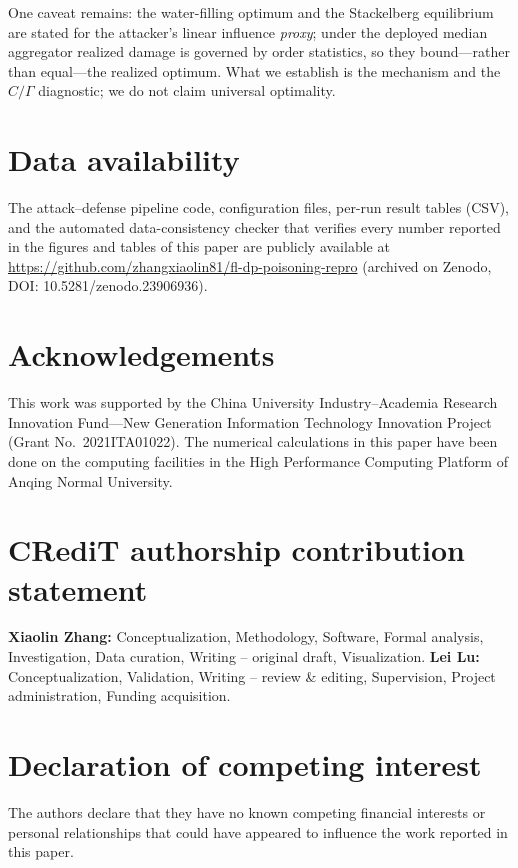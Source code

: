 \documentclass[final,1p,times]{elsarticle}
\begin{document}
One caveat remains: the water-filling optimum and the Stackelberg
equilibrium are stated for the attacker's linear influence \emph{proxy}; under the deployed
median aggregator realized damage is governed by order statistics, so they
bound---rather than equal---the realized optimum. What we establish is
the mechanism and the $C/\Gamma$ diagnostic; we do not claim universal
optimality.

\section*{Data availability}
The attack--defense pipeline code, configuration files, per-run result
tables (CSV), and the automated data-consistency checker that verifies
every number reported in the figures and tables of this paper are publicly
available at \url{https://github.com/zhangxiaolin81/fl-dp-poisoning-repro}
(archived on Zenodo, DOI: 10.5281/zenodo.23906936).

\clearpage
\section*{Acknowledgements}
This work was supported by the China University Industry--Academia
Research Innovation Fund---New Generation Information Technology
Innovation Project (Grant No.~2021ITA01022). The numerical
calculations in this paper have been done on the computing facilities
in the High Performance Computing Platform of Anqing Normal University.

\section*{CRediT authorship contribution statement}
\textbf{Xiaolin Zhang:} Conceptualization, Methodology, Software,
Formal analysis, Investigation, Data curation, Writing -- original draft,
Visualization. \textbf{Lei Lu:} Conceptualization, Validation, Writing --
review \& editing, Supervision, Project administration, Funding acquisition.

\section*{Declaration of competing interest}
The authors declare that they have no known competing financial interests
or personal relationships that could have appeared to influence the work
reported in this paper.
\end{document}
